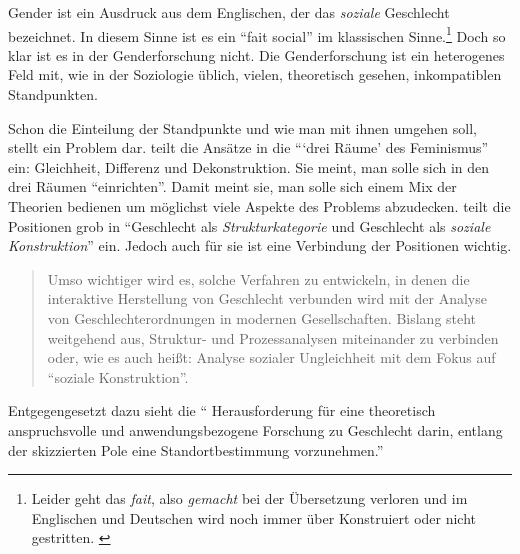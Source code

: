   Gender ist ein Ausdruck aus dem Englischen, der das \emph{soziale} Geschlecht
  bezeichnet. In diesem Sinne ist es ein \hyphenquote{french}{fait social} im
  klassischen Sinne.\footnote{Leider geht das \emph{fait}, also \emph{gemacht}
  bei der Übersetzung verloren und im Englischen und Deutschen wird noch immer
  über Konstruiert oder nicht gestritten. \parencite[152--161]{Latour2010}}
  \parencite[Kap.\,1]{Durkheim1970} Doch so klar ist es in der Genderforschung
  nicht. Die Genderforschung ist ein heterogenes Feld mit, wie in der Soziologie
  üblich, vielen, theoretisch gesehen, inkompatiblen Standpunkten.
  \parencite[67]{Nissen1998}

  Schon die Einteilung der Standpunkte und wie man mit ihnen umgehen soll,
  stellt ein Problem dar.  teilt die Ansätze in die
  \enquote{\enquote{drei Räume} des Feminismus} ein: Gleichheit, Differenz und
  Dekonstruktion. Sie meint, man solle sich in den drei Räumen
  \enquote{einrichten}. Damit meint sie, man solle sich einem Mix der Theorien
  bedienen um möglichst viele Aspekte des Problems abzudecken.
   teilt die Positionen grob in
  \enquote{Geschlecht als \emph{Strukturkategorie} und Geschlecht als
  \emph{soziale Konstruktion}} ein. Jedoch auch für sie ist eine Verbindung der
  Positionen wichtig. \blockcquote[223]{Gildemeister2000}{Umso wichtiger wird
  es, solche Verfahren zu entwickeln, in denen die interaktive Herstellung von
  Geschlecht verbunden wird mit der Analyse von Geschlechterordnungen in
  modernen Gesellschaften. Bislang steht weitgehend aus, Struktur- und
  Prozessanalysen miteinander zu verbinden oder, wie es auch heißt: Analyse
  sozialer Ungleichheit mit dem Fokus auf \enquote{soziale Konstruktion}.}
  Entgegengesetzt dazu sieht  die
  \enquote{\textelp{} Herausforderung für eine theoretisch anspruchsvolle und
  anwendungsbezogene Forschung zu Geschlecht \textelp{} darin, entlang der
  skizzierten Pole eine Standortbestimmung vorzunehmen.}

